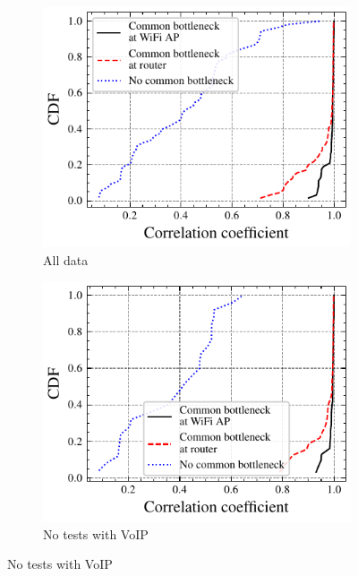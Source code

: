 \begin{figure}
  \centering
  \begin{subfigure}{0.49\textwidth}
    \centering
    \includegraphics[width=\textwidth]{figures/double-cdf/double-cdf-all-over2-no-only-video.pdf}
    \caption{\label{subfig:double-cdf-all}All data}
  \end{subfigure}%
  \hfill
  \begin{subfigure}{0.49\textwidth}
    \centering
    \includegraphics[width=\textwidth]{figures/double-cdf/double-cdf-all-over2-no-video.pdf}
    \caption{\label{subfig:double-cdf-novideo}No tests with VoIP}
  \end{subfigure}%
\end{figure}
